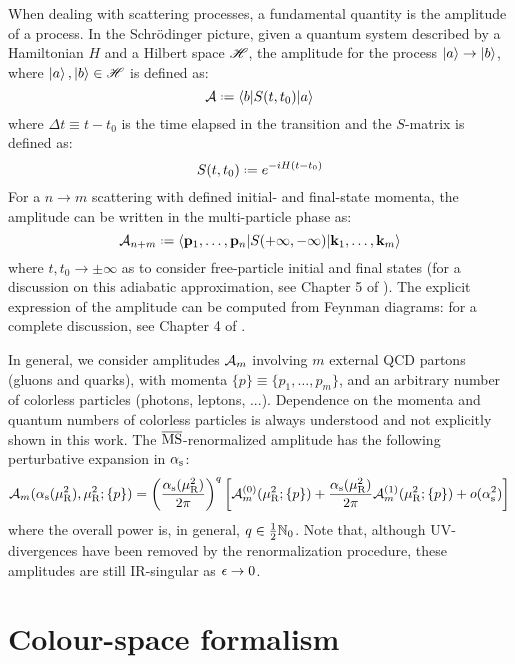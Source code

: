 When dealing with scattering processes, a fundamental quantity is the amplitude of a process. In the Schrödinger picture, given a quantum system described by a Hamiltonian $ H $ and a Hilbert space $ \mathscr{H} $, the amplitude for the process $ \ket{a} \rightarrow \ket{b} $, where $ \ket{a} , \ket{b} \in \mathscr{H} $ is defined as:
\begin{equation}
  \ampl \defeq \braket{b | \smat(t , t_0) | a}
\end{equation}
where $ \Delta t \equiv t - t_0 $ is the time elapsed in the transition and the $ S $-matrix is defined as:
\begin{equation}
  \smat(t , t_0) \defeq e^{- i H (t - t_0)}
\end{equation}
For a $ n \rightarrow m $ scattering with defined initial- and final-state momenta, the amplitude can be written in the multi-particle phase as:
\begin{equation}
  \ampl_{n + m} \defeq \braket{\ve{p}_1, \dots, \ve{p}_n | \smat(+\infty , -\infty) | \ve{k}_1, \dots, \ve{k}_m} 
\end{equation}
where $ t, t_0 \rightarrow \pm \infty $ as to consider free-particle initial and final states (for a discussion on this adiabatic approximation, see Chapter 5 of \cite{Itzykson-1980}). The explicit expression of the amplitude can be computed from Feynman diagrams: for a complete discussion, see Chapter 4 of \cite{Peskin-1995}.

In general, we consider amplitudes $ \mathcal{A}_m $ involving $ m $ external QCD partons (gluons and quarks), with momenta $ \{p\} \equiv \{p_1, \dots, p_m\} $, and an arbitrary number of colorless particles (photons, leptons, ...). Dependence on the momenta and quantum numbers of colorless particles is always understood and not explicitly shown in this work. The $ \overline{\text{MS}} $-renormalized amplitude has the following perturbative expansion in $ \alpha_\text{s} $:
\begin{equation}
  \mathcal{A}_m(\alpha_\text{s}(\mu_\text{R}^2), \mu_\text{R}^2 ; \{p\}) = \left( \frac{\alpha_\text{s}(\mu_\text{R}^2)}{2\pi} \right)^q \left[ \mathcal{A}_m^{(0)}(\mu_\text{R}^2 ; \{p\}) + \frac{\alpha_\text{s}(\mu_\text{R}^2)}{2\pi} \mathcal{A}_m^{(1)}(\mu_\text{R}^2 ; \{p\}) + o(\alpha_\text{s}^2) \right]
  \label{eq:mat-exp}
\end{equation}
where the overall power is, in general, $ q \in \frac{1}{2} \mathbb{N}_0 $. Note that, although UV-divergences have been removed by the renormalization procedure, these amplitudes are still IR-singular as $ \epsilon \rightarrow 0 $.

\section{Colour-space formalism}
\label{sec:colour-space}

